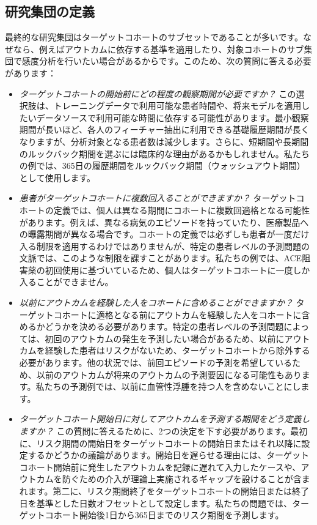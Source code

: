 \documentclass[
  11pt]{book}
\theoremstyle{definition}
\theoremstyle{definition}
\theoremstyle{definition}
\theoremstyle{definition}
\theoremstyle{remark}
\begin{document}
\subsection{研究集団の定義}\label{ux7814ux7a76ux96c6ux56e3ux306eux5b9aux7fa9-1}

最終的な研究集団はターゲットコホートのサブセットであることが多いです。なぜなら、例えばアウトカムに依存する基準を適用したり、対象コホートのサブ集団で感度分析を行いたい場合があるからです。このため、次の質問に答える必要があります：

\begin{itemize}
\item
  \emph{ターゲットコホートの開始前にどの程度の観察期間が必要ですか？} この選択肢は、トレーニングデータで利用可能な患者時間や、将来モデルを適用したいデータソースで利用可能な時間に依存する可能性があります。最小観察期間が長いほど、各人のフィーチャー抽出に利用できる基礎履歴期間が長くなりますが、分析対象となる患者数は減少します。さらに、短期間や長期間のルックバック期間を選ぶには臨床的な理由があるかもしれません。私たちの例では、365日の履歴期間をルックバック期間（ウォッシュアウト期間）として使用します。
\item
  \emph{患者がターゲットコホートに複数回入ることができますか？} ターゲットコホートの定義では、個人は異なる期間にコホートに複数回適格となる可能性があります。例えば、異なる病気のエピソードを持っていたり、医療製品への曝露期間が異なる場合です。コホートの定義では必ずしも患者が一度だけ入る制限を適用するわけではありませんが、特定の患者レベルの予測問題の文脈では、このような制限を課すことがあります。私たちの例では、ACE阻害薬の初回使用に基づいているため、個人はターゲットコホートに一度しか入ることができません。
\item
  \emph{以前にアウトカムを経験した人をコホートに含めることができますか？} ターゲットコホートに適格となる前にアウトカムを経験した人をコホートに含めるかどうかを決める必要があります。特定の患者レベルの予測問題によっては、初回のアウトカムの発生を予測したい場合があるため、以前にアウトカムを経験した患者はリスクがないため、ターゲットコホートから除外する必要があります。他の状況では、前回エピソードの予測を希望しているため、以前のアウトカムが将来のアウトカムの予測要因になる可能性もあります。私たちの予測例では、以前に血管性浮腫を持つ人を含めないことにします。
\item
  \emph{ターゲットコホート開始日に対してアウトカムを予測する期間をどう定義しますか？} この質問に答えるために、2つの決定を下す必要があります。最初に、リスク期間の開始日をターゲットコホートの開始日またはそれ以降に設定するかどうかの議論があります。開始日を遅らせる理由には、ターゲットコホート開始前に発生したアウトカムを記録に遅れて入力したケースや、アウトカムを防ぐための介入が理論上実施されるギャップを設けることが含まれます。第二に、リスク期間終了をターゲットコホートの開始日または終了日を基準とした日数オフセットとして設定します。私たちの問題では、ターゲットコホート開始後1日から365日までのリスク期間を予測します。

\end{itemize}
\end{document}

